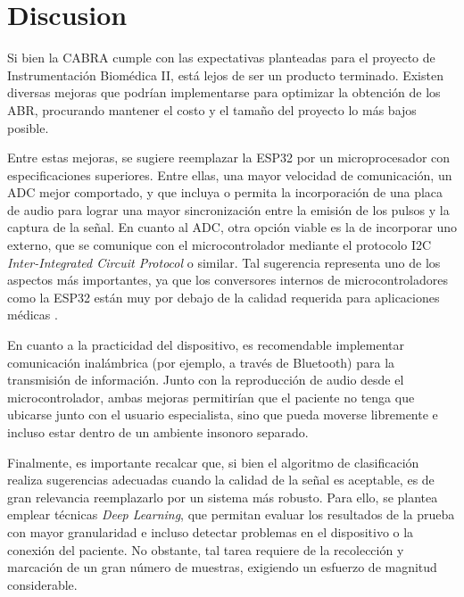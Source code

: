 \section{Discusion} \label{discusion}
Si bien la CABRA cumple con las expectativas planteadas para el proyecto de Instrumentación Biomédica II, está lejos de ser un producto terminado. Existen diversas mejoras que podrían implementarse para optimizar la obtención de los ABR, procurando mantener el costo y el tamaño del proyecto lo más bajos posible.

Entre estas mejoras, se sugiere reemplazar la ESP32 por un microprocesador con especificaciones superiores. Entre ellas, una mayor velocidad de comunicación, un ADC mejor comportado, y que incluya o permita la incorporación de una placa de audio para lograr una mayor sincronización entre la emisión de los pulsos y la captura de la señal. En cuanto al ADC, otra opción viable es la de incorporar uno externo, que se comunique con el microcontrolador mediante el protocolo I2C \textit{Inter-Integrated Circuit Protocol} o similar. Tal sugerencia representa uno de los aspectos más importantes, ya que los conversores internos de microcontroladores como la ESP32 están muy por debajo de la calidad requerida para aplicaciones médicas \cite{espressif-systems-ESP32}.

En cuanto a la practicidad del dispositivo, es recomendable implementar comunicación inalámbrica (por ejemplo, a través de Bluetooth) para la transmisión de información. Junto con la reproducción de audio desde el microcontrolador, ambas mejoras permitirían que el paciente no tenga que ubicarse junto con el usuario especialista, sino que pueda moverse libremente e incluso estar dentro de un ambiente insonoro separado.

Finalmente, es importante recalcar que, si bien el algoritmo de clasificación realiza sugerencias adecuadas cuando la calidad de la señal es aceptable, es de gran relevancia reemplazarlo por un sistema más robusto. Para ello, se plantea emplear técnicas \textit{Deep Learning}, que permitan evaluar los resultados de la prueba con mayor granularidad e incluso detectar problemas en el dispositivo o la conexión del paciente. No obstante, tal tarea requiere de la recolección y marcación de un gran número de muestras, exigiendo un esfuerzo de magnitud considerable.

